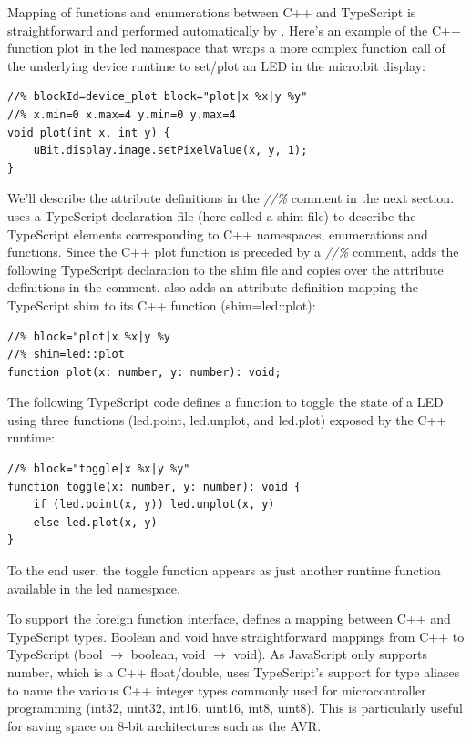 {Mapping of functions and enumerations between C++ and TypeScript is straightforward
and performed automatically by \MC. 
Here's an example of the C++ function plot in the led namespace that wraps a more
complex function call of the underlying device runtime to set/plot an LED in the micro:bit display:

\begin{lstlisting}
//% blockId=device_plot block="plot|x %x|y %y"
//% x.min=0 x.max=4 y.min=0 y.max=4
void plot(int x, int y) {
    uBit.display.image.setPixelValue(x, y, 1);
}
\end{lstlisting}

We'll describe the attribute definitions in the \emph{//\%} comment in the next section. 
\MC uses a TypeScript declaration file (here called a shim file) to describe the TypeScript elements corresponding
to C++ namespaces, enumerations and functions.
Since the C++ plot function is preceded by a \emph{//\%} comment, 
\MC adds the following TypeScript declaration to the shim file and copies
over the attribute definitions in the comment. \MC also adds an attribute definition mapping
the TypeScript shim to its C++ function (shim=led::plot):

\begin{lstlisting}
//% block="plot|x %x|y %y
//% shim=led::plot
function plot(x: number, y: number): void;
\end{lstlisting}

The following TypeScript code defines a function to toggle the state of a LED
using three functions (led.point, led.unplot, and led.plot) exposed by the C++ runtime:  
\begin{lstlisting}
//% block="toggle|x %x|y %y"
function toggle(x: number, y: number): void {
    if (led.point(x, y)) led.unplot(x, y)
    else led.plot(x, y)
}
\end{lstlisting}
To the end user, the toggle function appears as just another runtime function available
in the led namespace. 


To support the foreign function interface, \MC defines a mapping between C++ and TypeScript types.
Boolean and void have straightforward mappings from C++ to TypeScript (bool $\rightarrow$ boolean, void $\rightarrow$ void). 
As JavaScript only supports number, which is a C++ float/double, \MC uses TypeScript's support
for type aliases to name the various C++ integer types commonly used for microcontroller programming
(int32, uint32, int16, uint16, int8, uint8). 
This is particularly useful for saving space on 8-bit architectures such as the AVR. 

}
